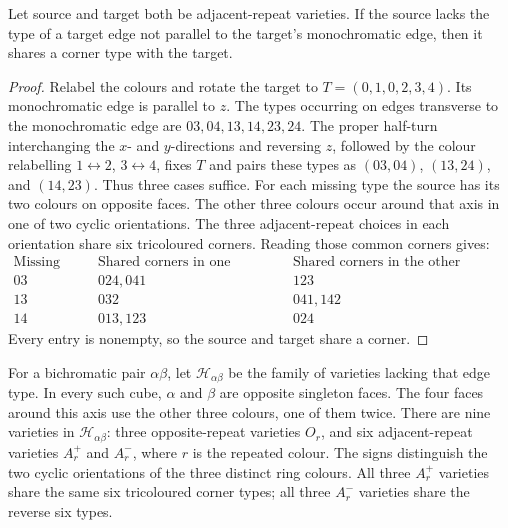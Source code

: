 \begin{lemma}\label{lem:transverse-corner}
Let source and target both be adjacent-repeat varieties. If the source
lacks the type of a target edge not parallel to the target's monochromatic
edge, then it shares a corner type with the target.
\end{lemma}
\begin{proof}
Relabel the colours and rotate the target to $T=(0,1,0,2,3,4)$.
Its monochromatic edge is parallel to $z$.
The types occurring on edges transverse to the monochromatic edge are
$03,04,13,14,23,24$.  The proper half-turn interchanging the $x$- and
$y$-directions and reversing $z$, followed by the colour relabelling
$1\leftrightarrow2$, $3\leftrightarrow4$, fixes $T$ and pairs these types
as $(03,04)$, $(13,24)$, and $(14,23)$.  Thus three cases suffice.
For each missing type the source has its two colours on opposite faces.
The other three colours occur around that axis in one of two cyclic
orientations.  The three adjacent-repeat choices in each orientation
share six tricoloured corners.  Reading those common corners gives:
\[
\begin{array}{c|c|c}
\text{Missing type}&\text{Shared corners in one orientation}
 &\text{Shared corners in the other orientation}\\\hline
03&024,041&123\\
13&032&041,142\\
14&013,123&024
\end{array}
\]
Every entry is nonempty, so the source and target share a corner.
\end{proof}

For a bichromatic pair $\alpha\beta$, let $\mathcal H_{\alpha\beta}$ be the family of
varieties lacking that edge type.  In every such cube, $\alpha$ and $\beta$ are
opposite singleton faces.  The four faces around this axis use the other
three colours, one of them twice.  There are nine varieties in
$\mathcal H_{\alpha\beta}$: three opposite-repeat varieties $O_r$, and six
adjacent-repeat varieties $A_r^+$ and $A_r^-$, where $r$ is the repeated
colour.  The signs distinguish the two cyclic orientations of the three
distinct ring colours.  All three $A_r^+$ varieties share the same six
tricoloured corner types; all three $A_r^-$ varieties share the reverse
six types.

